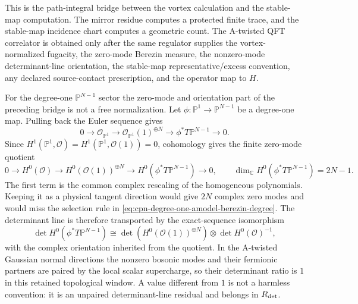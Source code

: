 \begin{remark}
This is the path-integral bridge between the vortex calculation and the
stable-map computation.  The mirror residue computes a protected finite trace, and
the stable-map incidence chart computes a geometric count.  The A-twisted QFT
correlator is obtained only after the same regulator supplies the
vortex-normalized fugacity, the zero-mode Berezin measure, the nonzero-mode
determinant-line orientation, the stable-map representative/excess convention,
any declared source-contact prescription, and the operator map to \(H\).
\end{remark}

\begin{example}
\label{ex:cpn-degree-one-euler-determinant-line}
For the degree-one \(\mathbb P^{N-1}\) sector the zero-mode and orientation
part of the preceding bridge is not a free normalization.  Let
\(\phi:\mathbb P^1\to\mathbb P^{N-1}\) be a degree-one map.  Pulling back the
Euler sequence gives
\[
  0\longrightarrow
  \mathcal O_{\mathbb P^1}
  \longrightarrow
  \mathcal O_{\mathbb P^1}(1)^{\oplus N}
  \longrightarrow
  \phi^\ast T\mathbb P^{N-1}
  \longrightarrow 0 .
\]
Since \(H^1(\mathbb P^1,\mathcal O)=H^1(\mathbb P^1,\mathcal O(1))=0\),
cohomology gives the finite zero-mode quotient
\begin{equation}
  0\longrightarrow
  H^0(\mathcal O)
  \longrightarrow
  H^0(\mathcal O(1))^{\oplus N}
  \longrightarrow
  H^0(\phi^\ast T\mathbb P^{N-1})
  \longrightarrow 0,
  \qquad
  \dim_{\mathbb C}H^0(\phi^\ast T\mathbb P^{N-1})=2N-1 .
  \label{eq:cpn-degree-one-euler-zero-mode-quotient}
\end{equation}
The first term is the common complex rescaling of the homogeneous
polynomials.  Keeping it as a physical tangent direction would give \(2N\)
complex zero modes and would miss the selection rule in
\eqref{eq:cpn-degree-one-amodel-berezin-degree}.  The determinant line is
therefore transported by the exact-sequence isomorphism
\begin{equation}
  \det H^0(\phi^\ast T\mathbb P^{N-1})
  \cong
  \det\!\left(H^0(\mathcal O(1))^{\oplus N}\right)
  \otimes
  \det H^0(\mathcal O)^{-1},
  \label{eq:cpn-degree-one-euler-determinant-line}
\end{equation}
with the complex orientation inherited from the quotient.  In the A-twisted
Gaussian normal directions the nonzero bosonic modes and their fermionic
partners are paired by the local scalar supercharge, so their determinant
ratio is \(1\) in this retained topological window.  A value different from
\(1\) is not a harmless convention: it is an unpaired determinant-line
residual and belongs in \(R_{\rm det}\).


\end{example}
